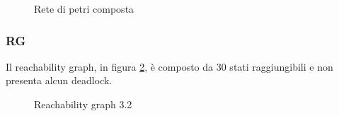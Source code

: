 \documentclass[a4paper]{article}
\begin{document}
\begin{figure}[!ht]
\centering
{}
\caption{Rete di petri composta} \label{FIG:3.2PN}
\end{figure}
\newpage
\subsubsection{RG}
Il reachability graph, in figura \ref{FIG:3.2RG}, è composto da 30 stati raggiungibili e non presenta alcun deadlock.
\begin{figure}[!ht]
\centering
{}
\caption{Reachability graph 3.2} \label{FIG:3.2RG}
\end{figure}
\newpage
\end{document}
